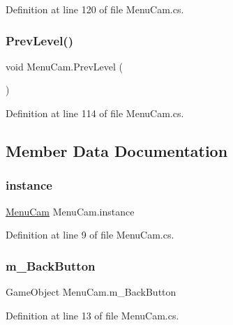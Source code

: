 Definition at line 120 of file Menu\+Cam.\+cs.

\mbox{\label{class_menu_cam_aa0e4bff687d9e8486a5c212dec6fcf3f}} 
\subsubsection{\texorpdfstring{Prev\+Level()}{PrevLevel()}}
{\footnotesize\ttfamily void Menu\+Cam.\+Prev\+Level (\begin{DoxyParamCaption}{ }\end{DoxyParamCaption})}



Definition at line 114 of file Menu\+Cam.\+cs.



\subsection{Member Data Documentation}
\mbox{\label{class_menu_cam_a919ea6a55394f24a933eb1137fa62088}} 
\subsubsection{\texorpdfstring{instance}{instance}}
{\footnotesize\ttfamily \mbox{\hyperlink{class_menu_cam}{Menu\+Cam}} Menu\+Cam.\+instance\hspace{0.3cm}{\ttfamily [static]}}



Definition at line 9 of file Menu\+Cam.\+cs.

\mbox{\label{class_menu_cam_a2fe7d2a774eafa062722685ba5f10862}} 
\subsubsection{\texorpdfstring{m\+\_\+\+Back\+Button}{m\_BackButton}}
{\footnotesize\ttfamily Game\+Object Menu\+Cam.\+m\+\_\+\+Back\+Button}



Definition at line 13 of file Menu\+Cam.\+cs.

